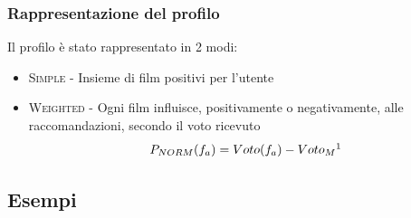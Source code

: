 \documentclass{beamer}
\begin{document}
\begin{frame}
\begin{columns}
\begin{column}{.65\paperwidth}
\end{column}
\end{columns}
\end{frame}


\begin{frame}
\frametitle{Rappresentazione del profilo}
Il profilo è stato rappresentato in 2 modi:
\begin{center}
\begin{itemize}
	\item \textsc{Simple} - Insieme di film positivi per l'utente
	\pause
	\item \textsc{Weighted} - Ogni film influisce, positivamente o negativamente, alle raccomandazioni, secondo il voto ricevuto
$$
P_{NORM}(f_a) = Voto(f_a)- Voto_M\footnote{Valor medio delle votazioni pari a 3}
$$
\end{itemize}
\end{center}

\end{frame}


\subsection{Esempi}
\end{document}
